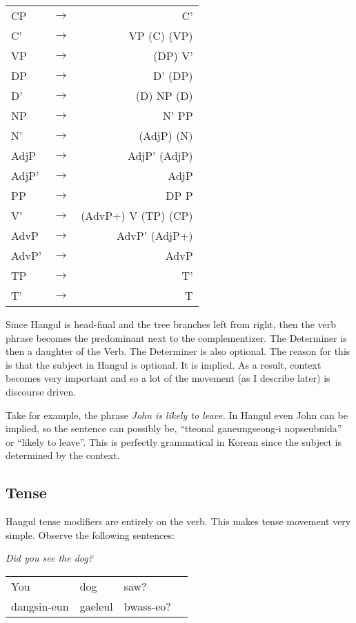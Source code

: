 \documentclass[11pt]{report}
\begin{document}
\begin{tabular}{lcr}
  CP& $\rightarrow$ & C' \\
  C' & $\rightarrow$ & VP (C) (VP)\\
  VP & $\rightarrow$ & (DP) V' \\ 
  DP & $\rightarrow$ & D' (DP) \\
  D' & $\rightarrow$ & (D) NP (D) \\
  NP & $\rightarrow$ & N' PP \\
  N' & $\rightarrow$ & (AdjP) (N) \\ 
  AdjP & $\rightarrow$ & AdjP' (AdjP) \\ 
  AdjP' & $\rightarrow$ & AdjP \\ 
  PP & $\rightarrow$ & DP P \\ 
  V' & $\rightarrow$ & (AdvP+) V (TP) (CP) \\ 
  AdvP & $\rightarrow$ & AdvP' (AdjP+) \\ 
  AdvP' & $\rightarrow$ & AdvP \\ 
  TP & $\rightarrow$ & T' \\ 
  T' & $\rightarrow$ & T   
\end{tabular}

Since Hangul is head-final and the tree branches left from right,
then the verb phrase becomes the predominant next to the
complementizer. The Determiner is then a daughter of the Verb. The
Determiner is also optional. The reason for this is that the subject
in Hangul is optional. It is implied. As a result, context becomes
very important and so a lot of the movement (as I describe later) is
discourse driven.

Take for example, the phrase \emph{John is likely to leave.} In Hangul
even John can be implied, so the sentence can possibly be, ``tteonal
ganeungseong-i nopseubnida'' or ``likely to leave''. This is perfectly
grammatical in Korean since the subject is determined by the context.

\subsection{Tense}
Hangul tense modifiers are entirely on the verb. This makes tense
movement very simple. Observe the following sentences:

\emph{Did you see the dog?}

\begin{tabular}{llll}
You & dog & saw? \\
dangsin-eun & gaeleul & bwass-eo?
\end{tabular}
\end{document}
